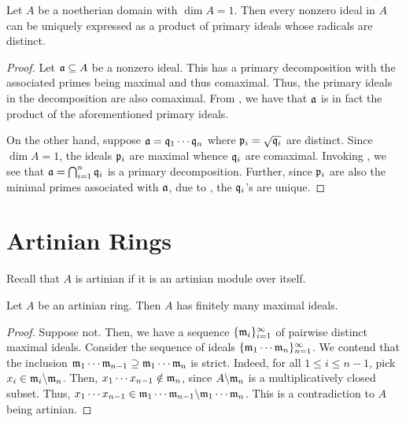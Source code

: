 \begin{lemma}
    Let $A$ be a noetherian domain with $\dim A = 1$. Then every nonzero ideal in $A$ can be uniquely expressed as a product of primary ideals whose radicals are distinct.
\end{lemma}
\begin{proof}
    Let $\mathfrak a\subseteq A$ be a nonzero ideal. This has a primary decomposition with the associated primes being maximal and thus comaximal. Thus, the primary ideals in the decomposition are also comaximal. From , we have that $\mathfrak a$ is in fact the product of the aforementioned primary ideals.

    On the other hand, suppose $\mathfrak a = \mathfrak q_1\cdots\mathfrak q_n$ where $\mathfrak p_i = \sqrt{\mathfrak q_i}$ are distinct. Since $\dim A = 1$, the ideals $\mathfrak p_i$ are maximal whence $\mathfrak q_i$ are comaximal. Invoking , we see that $\mathfrak a = \bigcap_{i = 1}^n\mathfrak q_i$ is a primary decomposition. Further, since $\mathfrak p_i$ are also the minimal primes associated with $\mathfrak a$, due to , the $\mathfrak q_i$'s are unique.
\end{proof}

\section{Artinian Rings}

Recall that $A$ is artinian if it is an artinian module over itself.

\begin{proposition}
    Let $A$ be an artinian ring. Then $A$ has finitely many maximal ideals.
\end{proposition}
\begin{proof}
    Suppose not. Then, we have a sequence $\{\mathfrak m_i\}_{i = 1}^\infty$ of pairwise distinct maximal ideals. Consider the sequence of ideals $\{\mathfrak m_1\cdots\mathfrak m_n\}_{n = 1}^\infty$. We contend that the inclusion $\mathfrak m_1\cdots\mathfrak m_{n - 1}\supseteq\mathfrak m_1\cdots\mathfrak m_n$ is strict. Indeed, for all $1\le i\le n - 1$, pick $x_i\in\mathfrak m_i\backslash\mathfrak m_n$. Then, $x_1\cdots x_{n - 1}\notin\mathfrak m_n$, since $A\backslash\mathfrak m_n$ is a multiplicatively closed subset. Thus, $x_1\cdots x_{n - 1}\in\mathfrak m_1\cdots\mathfrak m_{n - 1}\backslash\mathfrak m_1\cdots\mathfrak m_n$. This is a contradiction to $A$ being artinian.
\end{proof}


